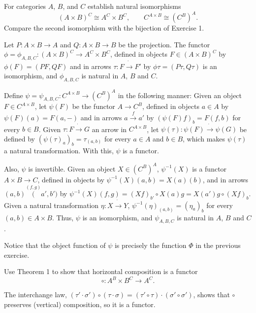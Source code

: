 \begin{exercise}
For categories $A$, $B$, and $C$ establish natural isomorphisms
\[(A\times B)^C\cong A^C\times B^C,\qquad C^{A\times B}\cong (C^B)^A.\]
Compare the second isomorphism with the bijection of Exercise 1.
\end{exercise}
\begin{solution}
Let $P:A\times B\to A$ and $Q:A\times B\to B$ be the projection. The functor $\phi=\phi_{A,B,C}:(A\times B)^C\to A^C\times B^C$, defined in objects $F\in (A\times B)^C$ by $\phi(F)=(PF,QF)$ and in arrows $\tau:F\dot{\to}F'$ by $\phi\tau=(P\tau,Q\tau)$ is an isomorphism, and $\phi_{A,B,C}$ is natural in $A$, $B$ and $C$.

Define $\psi=\psi_{A,B,C}:C^{A\times B}\to (C^B)^A$ in the following manner: Given an object $F\in C^{A\times B}$, let $\psi(F)$ be the functor $A\to C^B$, defined in objects $a\in A$ by $\psi(F)(a)=F(a,-)$ and in arrows $a\overset{f}{\to}a'$ by $(\psi(F)f)_b=F(f,b)$ for every $b\in B$. Given $\tau:F\dot{\to}G$ an arrow in $C^{A\times B}$, let $\psi(\tau):\psi(F)\dot{\to}\psi(G)$ be defined by $(\psi(\tau)_a)_b=\tau_{(a,b)}$ for every $a\in A$ and $b\in B$, which makes $\psi(\tau)$ a natural transformation. With this, $\psi$ is a functor.

Also, $\psi$ is invertible. Given an object $X\in (C^B)^A$, $\psi^{-1}(X)$ is a functor $A\times B\to C$, defined in objects by $\psi^{-1}(X)(a,b)=X(a)(b)$, and in arrows $(a,b)\overset{(f,g)}(a',b')$ by $\psi^{-1}(X)(f,g)=(Xf)_{b'}\circ X(a)g=X(a')g\circ(Xf)_b$. Given a natural transformation $\eta:X\dot{\to}Y$, $\psi^{-1}(\eta)_{(a,b)}=(\eta_{a})_b$ for every $(a,b)\in A\times B$. Thus, $\psi$ is an isomorphism, and $\psi_{A,B,C}$ is natural in $A$, $B$ and $C$.

Notice that the object function of $\psi$ is precisely the function $\Phi$ in the previous exercise.
\end{solution}

\begin{exercise}
Use Theorem 1 to show that horizontal composition is a functor
\[\circ: A^B\times B^C\to A^C.\]
\end{exercise}
\begin{solution}
The interchange law, $(\tau'\cdot\sigma')\circ(\tau\cdot\sigma)=(\tau'\circ\tau)\cdot(\sigma'\circ\sigma')$, shows that $\circ$ preserves (vertical) composition, so it is a functor.
\end{solution}

